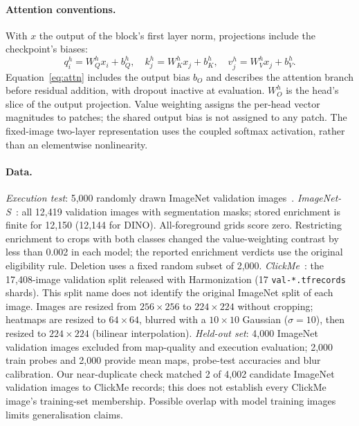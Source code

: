 \paragraph{Attention conventions.} With $x$ the output of the block's first layer norm, projections include the checkpoint's biases:
\[
q_i^h=W_Q^hx_i+b_Q^h,\quad k_j^h=W_K^hx_j+b_K^h,\quad v_j^h=W_V^hx_j+b_V^h.
\]
Equation~\ref{eq:attn} includes the output bias $b_O$ and describes the attention branch before residual addition, with dropout inactive at evaluation. $W_O^h$ is the head's slice of the output projection. Value weighting assigns the per-head vector magnitudes to patches; the shared output bias is not assigned to any patch. The fixed-image two-layer representation uses the coupled softmax activation, rather than an elementwise nonlinearity.

\paragraph{Data.} \emph{Execution test}: 5,000 randomly drawn ImageNet validation images~\citep{deng2009}. \emph{ImageNet-S}~\citep{gao2023}: all 12,419 validation images with segmentation masks; stored enrichment is finite for 12,150 (12,144 for DINO). All-foreground grids score zero. Restricting enrichment to crops with both classes changed the value-weighting contrast by less than 0.002 in each model; the reported enrichment verdicts use the original eligibility rule. Deletion uses a fixed random subset of 2,000. \emph{ClickMe}~\citep{linsley2019,fel2022}: the 17,408-image validation split released with Harmonization (17 \texttt{val-*.tfrecords} shards). This split name does not identify the original ImageNet split of each image. Images are resized from $256{\times}256$ to $224{\times}224$ without cropping; heatmaps are resized to $64{\times}64$, blurred with a $10{\times}10$ Gaussian ($\sigma=10$), then resized to $224{\times}224$ (bilinear interpolation). \emph{Held-out set}: 4,000 ImageNet validation images excluded from map-quality and execution evaluation; 2,000 train probes and 2,000 provide mean maps, probe-test accuracies and blur calibration. Our near-duplicate check matched 2 of 4,002 candidate ImageNet validation images to ClickMe records; this does not establish every ClickMe image's training-set membership. Possible overlap with model training images limits generalisation claims.


